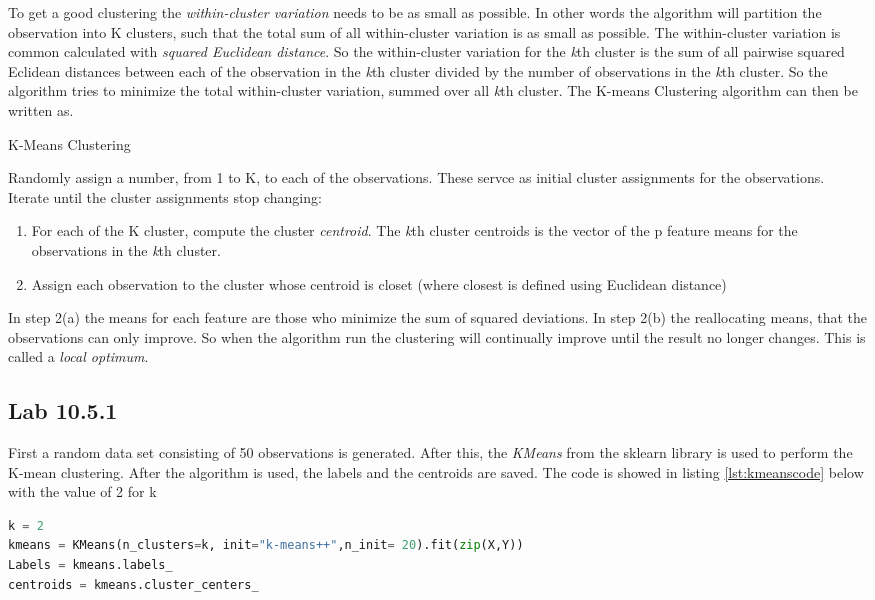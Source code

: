To get a good clustering the \emph{within-cluster variation} needs to be as small as possible. In other words the algorithm will partition the observation into K clusters, such that the total sum of all within-cluster variation is as small as possible. The within-cluster variation is common calculated with \emph{squared Euclidean distance}.
So the within-cluster variation for the \emph{k}th cluster is the sum of all pairwise squared Eclidean distances between each of the observation in the \emph{k}th cluster divided by the number of observations in the \emph{k}th cluster.
So the algorithm tries to minimize the total within-cluster variation, summed over all \emph{k}th cluster.
The K-means Clustering algorithm can then be written as.

\begin{algorithm}
	\caption{K-Means Clustering}
	\label{algo:KMeansClustering}
	\begin{algorithmic}[1]
		\State Randomly assign a number, from 1 to K, to each of the observations. These servce as initial cluster assignments for the observations. 
		\State Iterate until the cluster assignments stop changing:
		\begin{enumerate}[label=(\alph*)]
			\item For each of the K cluster, compute the cluster \emph{centroid}. The \emph{k}th cluster centroids is the vector of the p feature means for the observations in the \emph{k}th cluster.
			\item Assign each observation to the cluster whose centroid is closet (where closest is defined using Euclidean distance) 
		\end{enumerate}
	\end{algorithmic}
\end{algorithm}

 In step 2(a) the means for each feature are those who minimize the sum of squared deviations. In step 2(b) the reallocating means, that the observations can only improve.
 So when the algorithm run the clustering will continually improve until the result no longer changes. This is called a \emph{local optimum}.
\subsection{Lab 10.5.1}
First a random data set consisting of 50 observations is generated. After this, the \emph{KMeans} from the sklearn library is used to perform the K-mean clustering.
After the algorithm is used, the labels and the centroids are saved. The code is showed in listing \ref{lst:kmeanscode} below with the value of 2 for k
\begin{lstlisting}[language=Python, label=lst:kmeanscode, caption=The KMean function and the code who saved the labels and centroids]
k = 2
kmeans = KMeans(n_clusters=k, init="k-means++",n_init= 20).fit(zip(X,Y))
Labels = kmeans.labels_
centroids = kmeans.cluster_centers_
\end{lstlisting}

